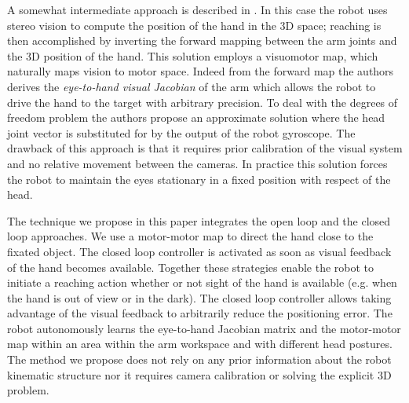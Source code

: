 A somewhat intermediate approach is described in \cite{scaz07fast}. In 
this case the robot uses stereo vision to compute the position
of the hand in the 3D space; reaching is then accomplished by inverting the 
forward mapping between the arm joints and the 3D position of the hand. This 
solution employs a visuomotor map, which naturally maps vision to motor space. 
Indeed from the forward map the authors derives the {\em eye-to-hand visual 
Jacobian} of the arm which allows the robot to drive the hand to the target with 
arbitrary precision. To deal with the degrees of freedom problem the authors
propose an approximate solution where the head joint vector is substituted 
for by the output of the robot gyroscope. The drawback of this approach is that 
it requires prior calibration of the visual system and no relative movement 
between the cameras. In practice this solution forces the robot to maintain 
the eyes stationary in a fixed position with respect of the head. 

The technique we propose in this paper integrates the open loop and the 
closed loop approaches. We use a motor-motor map to direct 
the hand close to the fixated object. The closed loop controller is activated 
as soon as visual feedback of the hand becomes available. Together 
these strategies enable the robot to initiate a reaching action whether or not 
sight of the hand is available (e.g. when the hand is 
out of view or in the dark). The closed loop controller allows taking
advantage of the visual feedback to arbitrarily reduce the positioning
error. The robot autonomously learns the eye-to-hand Jacobian matrix and 
the motor-motor map within an area within the arm workspace and with different
head postures. The method we propose does not rely on any prior information
about the robot kinematic structure nor it requires camera calibration 
or solving the explicit 3D problem.
